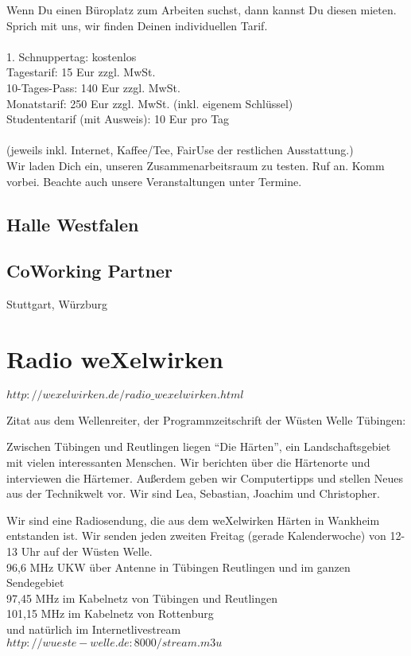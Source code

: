 Wenn Du einen Büroplatz zum Arbeiten suchst, dann kannst Du diesen mieten.
Sprich mit uns, wir finden Deinen individuellen Tarif.\\
\\
    1. Schnuppertag: kostenlos\\
    Tagestarif: 15 Eur zzgl. MwSt.\\ 
    10-Tages-Pass: 140 Eur zzgl. MwSt.\\
    Monatstarif: 250 Eur zzgl. MwSt. (inkl. eigenem Schlüssel)\\
    Studententarif (mit Ausweis): 10 Eur pro Tag\\
\\
(jeweils inkl. Internet, Kaffee/Tee, FairUse der restlichen Ausstattung.)\\

Wir laden Dich ein, unseren Zusammenarbeitsraum zu testen.
%
Ruf an. Komm vorbei.
%
Beachte auch unsere Veranstaltungen unter Termine.
     \subsection{Halle Westfalen}
     \subsection{CoWorking Partner}
  Stuttgart, Würzburg
  \section{Radio weXelwirken}      
$http://wexelwirken.de/radio\_wexelwirken.html$
      


Zitat aus dem Wellenreiter, der Programmzeitschrift der Wüsten Welle Tübingen:



Zwischen Tübingen und Reutlingen liegen "`Die Härten"', ein Landschaftsgebiet mit vielen interessanten Menschen.
%
Wir berichten über die Härtenorte und interviewen die Härtemer.
%
Außerdem geben wir Computertipps und stellen Neues aus der Technikwelt vor.
%
Wir sind Lea, Sebastian, Joachim und Christopher.



Wir sind eine Radiosendung, die aus dem weXelwirken Härten in Wankheim entstanden ist.
%
Wir senden jeden zweiten Freitag (gerade Kalenderwoche) von 12-13 Uhr auf der Wüsten Welle.\\
96,6 MHz UKW über Antenne in Tübingen Reutlingen und im ganzen Sendegebiet\\
97,45 MHz im Kabelnetz von Tübingen und Reutlingen\\
101,15 MHz im Kabelnetz von Rottenburg\\
und natürlich im Internetlivestream\\
$http://wueste-welle.de:8000/stream.m3u$

